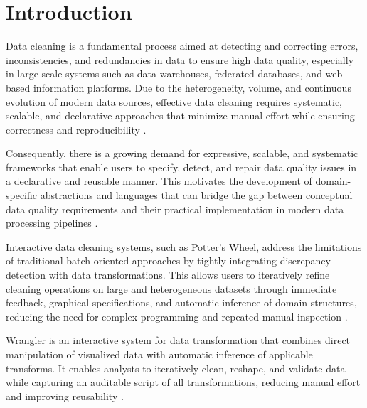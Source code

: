 \chapter*{Introduction}


\par Data cleaning is a fundamental process aimed at detecting and correcting errors, inconsistencies, and redundancies in data to ensure high data quality, especially in large-scale systems such as data warehouses, federated databases, and web-based information platforms. Due to the heterogeneity, volume, and continuous evolution of modern data sources, effective data cleaning requires systematic, scalable, and declarative approaches that minimize manual effort while ensuring correctness and reproducibility \cite{rahm2000data}.

Consequently, there is a growing demand for expressive, scalable, and systematic frameworks that enable users to specify, detect, and repair data quality issues in a declarative and reusable manner. This motivates the development of domain-specific abstractions and languages that can bridge the gap between conceptual data quality requirements and their practical implementation in modern data processing pipelines \cite{chu2016datacleaning,rahm2000data}.

Interactive data cleaning systems, such as Potter's Wheel, address the limitations of traditional batch-oriented approaches by tightly integrating discrepancy detection with data transformations. This allows users to iteratively refine cleaning operations on large and heterogeneous datasets through immediate feedback, graphical specifications, and automatic inference of domain structures, reducing the need for complex programming and repeated manual inspection \cite{raman2001potterswheel}.

Wrangler is an interactive system for data transformation that combines direct manipulation of visualized data with automatic inference of applicable transforms. It enables analysts to iteratively clean, reshape, and validate data while capturing an auditable script of all transformations, reducing manual effort and improving reusability \cite{kandel2011wrangler}.
